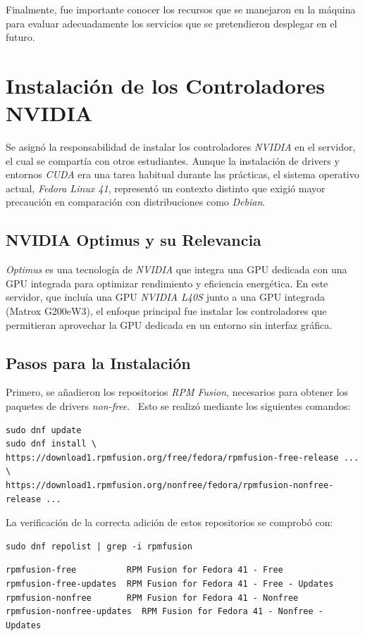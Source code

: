 Finalmente, fue importante conocer los recursos que se manejaron en la máquina para evaluar adecuadamente los servicios que se pretendieron desplegar en el futuro.

\newpage
\section{Instalación de los Controladores NVIDIA}
Se asignó la responsabilidad de instalar los controladores \textit{NVIDIA} en el servidor, el cual se compartía con otros estudiantes. Aunque la instalación de drivers y entornos \textit{CUDA} era una tarea habitual durante las prácticas, el sistema operativo actual, \textit{Fedora Linux 41}, representó un contexto distinto que exigió mayor precaución en comparación con distribuciones como \textit{Debian}.~\cite{ref25}

\subsection*{NVIDIA Optimus y su Relevancia}
\textit{Optimus} es una tecnología de \textit{NVIDIA} que integra una GPU dedicada con una GPU integrada para optimizar rendimiento y eficiencia energética. En este servidor, que incluía una GPU \textit{NVIDIA L40S} junto a una GPU integrada (Matrox G200eW3), el enfoque principal fue instalar los controladores que permitieran aprovechar la GPU dedicada en un entorno sin interfaz gráfica.~\cite{ref22}

\subsection*{Pasos para la Instalación}
Primero, se añadieron los repositorios \textit{RPM Fusion}, necesarios para obtener los paquetes de drivers \textit{non-free}.~\cite{ref23} Esto se realizó mediante los siguientes comandos:
\begin{verbatim}
sudo dnf update
sudo dnf install \
https://download1.rpmfusion.org/free/fedora/rpmfusion-free-release ... \
https://download1.rpmfusion.org/nonfree/fedora/rpmfusion-nonfree-release ...
\end{verbatim}

La verificación de la correcta adición de estos repositorios se comprobó con:
\begin{verbatim}
sudo dnf repolist | grep -i rpmfusion
\end{verbatim}

\begin{verbatim}
rpmfusion-free          RPM Fusion for Fedora 41 - Free
rpmfusion-free-updates  RPM Fusion for Fedora 41 - Free - Updates
rpmfusion-nonfree       RPM Fusion for Fedora 41 - Nonfree
rpmfusion-nonfree-updates  RPM Fusion for Fedora 41 - Nonfree - Updates
\end{verbatim}


